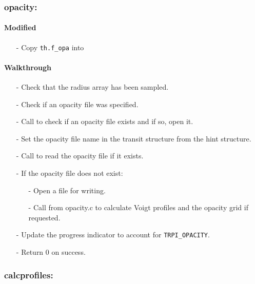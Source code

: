 \documentclass[letterpaper,12pt]{article}
\begin{document}
\subsubsection{opacity:}
\paragraph{Modified}
\begin{enumerate}[leftmargin=10pt, noitemsep, parsep=0pt, topsep=0ex]
\item[-] Copy {\tt th.f\_opa} into 
\end{enumerate}

\paragraph{Walkthrough}
\begin{enumerate}[leftmargin=10pt, noitemsep, parsep=0pt, topsep=0ex]
\item[-] Check that the radius array has been sampled.
\item[-] Check if an opacity file was specified.
\item[-] Call  to check if an opacity file exists and if so, open it.
\item[-] Set the opacity file name in the transit structure from the hint structure.
\item[-] Call  to read the opacity file if it exists.
\item[-] If the opacity file does not exist:
\begin{enumerate}[leftmargin=10pt, noitemsep, parsep=0pt, topsep=0ex]
\item[-] Open a file for writing.
\item[-] Call  from opacity.c to calculate Voigt profiles and the opacity grid if requested.
\end{enumerate}
\item[-] Update the progress indicator to account for {\tt TRPI\_OPACITY}.
\item[-] Return 0 on success.
\end{enumerate}

\subsubsection{calcprofiles:}
\end{document}
